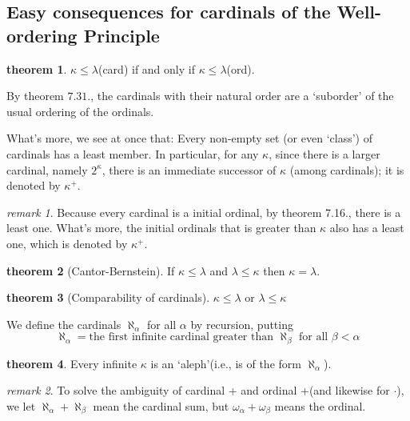 \documentclass[a4paper,11pt]{article}%
\theoremstyle{remark}
\newtheorem*{remark}{remark}
\theoremstyle{definition}
\newtheorem{theorem}{theorem}[section]
\theoremstyle{definition}
\theoremstyle{plain}
\theoremstyle{definition}
\begin{document}
\subsection{Easy consequences for cardinals of the Well-ordering Principle}
\begin{theorem}
    $\kappa\leq\lambda$(card) if and only if $\kappa\leq\lambda$(ord).
\end{theorem}
By theorem $7.31.$, the cardinals with their natural order are a `suborder' of the usual 
ordering of the ordinals.

What's more, we see at once that: Every non-empty set (or even `class')
of cardinals has a least member. In particular, for any $\kappa$,
since there is a larger cardinal, namely $2^{\kappa}$, there is an immediate 
successor of $\kappa$ (among cardinals); it is denoted by $\kappa^+$.
\begin{remark}
    Because every cardinal is a initial ordinal, by theorem 7.16., there 
    is a least one. What's more, the initial ordinals that is greater than 
    $\kappa$ also has a least one, which is denoted by $\kappa^+$.
\end{remark}
\begin{theorem}[Cantor-Bernstein]
    If $\kappa\leq\lambda$ and $\lambda\leq\kappa$ then $\kappa=\lambda$.
\end{theorem}
\begin{theorem}[Comparability of cardinals]
    $\kappa\leq\lambda$ or $\lambda\leq\kappa$
\end{theorem}
We define  the cardinals $\aleph_{\alpha}$ for all $\alpha$ by recursion, putting 
\[\aleph_{\alpha}=\text{the first infinite cardinal greater than }\aleph_{\beta} \text{ for all } \beta<\alpha\]
\begin{theorem}
    Every infinite $\kappa$ is an `aleph'(i.e., is of the form $\aleph_{\alpha}$).
\end{theorem}
\begin{remark}
    To solve the ambiguity of cardinal + and ordinal +(and likewise for $\cdot$), 
    we let $\aleph_{\alpha}+\aleph_{\beta}$ mean the cardinal sum, but $\omega_{\alpha}+\omega_{\beta}$ means the ordinal.
\end{remark}
\end{document}
